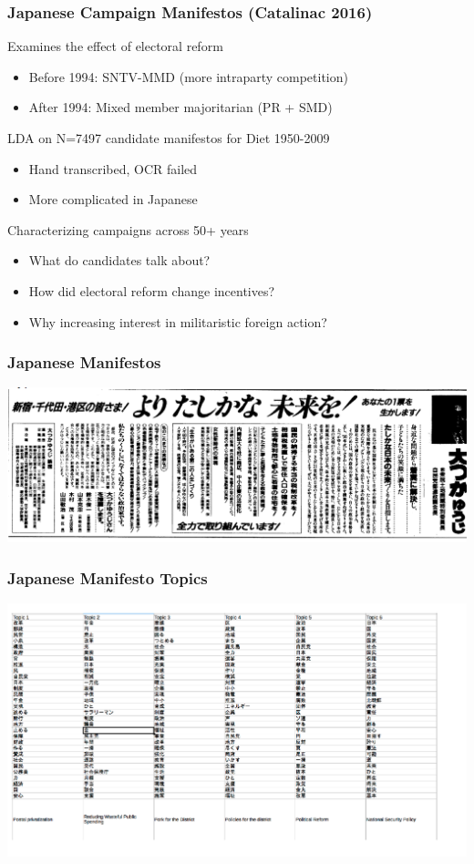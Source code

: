 \documentclass[11pt,compress,professionalfonts]{beamer}
\newcommand{\ita}{\begin{itemize}}
\newcommand{\itm}{\item[]}
\newcommand{\itz}{\end{itemize}}
\begin{document}
\begin{frame}[t,fragile]\frametitle{Japanese Campaign Manifestos (Catalinac 2016)}
Examines the effect of electoral reform
\ita
\itm Before 1994: SNTV-MMD (more intraparty competition)
\itm After 1994: Mixed member majoritarian (PR + SMD)
\itz
LDA on N=7497 candidate manifestos for Diet 1950-2009
\ita
\itm Hand transcribed, OCR failed
\itm More complicated in Japanese
\itz
Characterizing campaigns across 50+ years
\ita
\itm What do candidates talk about?
\itm How did electoral reform change incentives?
\itm Why increasing interest in militaristic foreign action? 
\itz
\end{frame}

\begin{frame}[t,fragile]\frametitle{Japanese Manifestos}
\vspace{10 mm}
\centerline{\includegraphics[scale=.27]{pictures/jpmanifesto.png}}
\end{frame}


\begin{frame}[t,fragile]\frametitle{Japanese Manifesto Topics}
\vspace{10 mm}
\centerline{\includegraphics[scale=.27]{pictures/jptopic.png}}
\end{frame}
\end{document}

